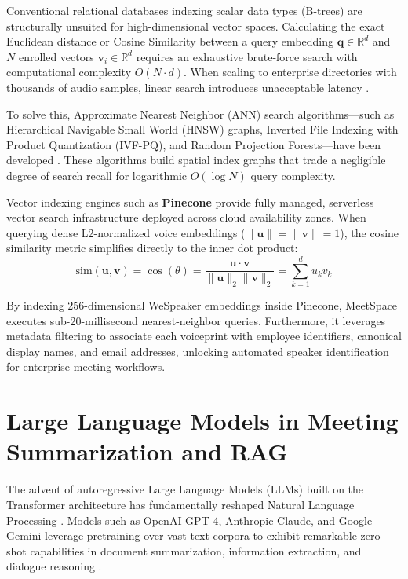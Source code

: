 \documentclass[12pt,oneside,letterpaper]{report}
\numberwithin{equation}{chapter} %
\begin{document}
Conventional relational databases indexing scalar data types (B-trees) are structurally unsuited for high-dimensional vector spaces. Calculating the exact Euclidean distance or Cosine Similarity between a query embedding $\mathbf{q} \in \mathbb{R}^d$ and $N$ enrolled vectors $\mathbf{v}_i \in \mathbb{R}^d$ requires an exhaustive brute-force search with computational complexity $O(N \cdot d)$. When scaling to enterprise directories with thousands of audio samples, linear search introduces unacceptable latency \cite{jegou2011product}.

To solve this, Approximate Nearest Neighbor (ANN) search algorithms---such as Hierarchical Navigable Small World (HNSW) graphs, Inverted File Indexing with Product Quantization (IVF-PQ), and Random Projection Forests---have been developed \cite{johnson2021billion}. These algorithms build spatial index graphs that trade a negligible degree of search recall for logarithmic $O(\log N)$ query complexity.

Vector indexing engines such as \textbf{Pinecone} provide fully managed, serverless vector search infrastructure deployed across cloud availability zones. When querying dense L2-normalized voice embeddings ($\|\mathbf{u}\| = \|\mathbf{v}\| = 1$), the cosine similarity metric simplifies directly to the inner dot product:
\begin{equation}
\text{sim}(\mathbf{u}, \mathbf{v}) = \cos(\theta) = \frac{\mathbf{u} \cdot \mathbf{v}}{\|\mathbf{u}\|_2 \|\mathbf{v}\|_2} = \sum_{k=1}^d u_k v_k
\label{eq:cosine_sim}
\end{equation}

By indexing 256-dimensional WeSpeaker embeddings inside Pinecone, MeetSpace executes sub-20-millisecond nearest-neighbor queries. Furthermore, it leverages metadata filtering to associate each voiceprint with employee identifiers, canonical display names, and email addresses, unlocking automated speaker identification for enterprise meeting workflows.

\section{Large Language Models in Meeting Summarization and RAG}
The advent of autoregressive Large Language Models (LLMs) built on the Transformer architecture has fundamentally reshaped Natural Language Processing \cite{vaswani2017attention}. Models such as OpenAI GPT-4, Anthropic Claude, and Google Gemini leverage pretraining over vast text corpora to exhibit remarkable zero-shot capabilities in document summarization, information extraction, and dialogue reasoning \cite{gemini2024report}.
\end{document}
